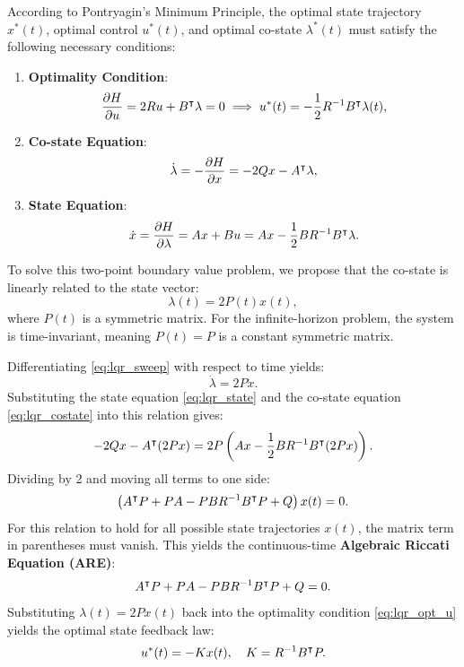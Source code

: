 According to Pontryagin's Minimum Principle, the optimal state trajectory $x^*(t)$, optimal control $u^*(t)$, and optimal co-state $\lambda^*(t)$ must satisfy the following necessary conditions:
\begin{enumerate}
    \item \textbf{Optimality Condition}:
    \begin{equation}
        \frac{\partial H}{\partial u} = 2 R u + B^\intercal \lambda = 0 \implies u^*(t) = -\frac{1}{2} R^{-1} B^\intercal \lambda(t) , \label{eq:lqr_opt_u}
    \end{equation}
    \item \textbf{Co-state Equation}:
    \begin{equation}
        \dot{\lambda} = -\frac{\partial H}{\partial x} = -2 Q x - A^\intercal \lambda , \label{eq:lqr_costate}
    \end{equation}
    \item \textbf{State Equation}:
    \begin{equation}
        \dot{x} = \frac{\partial H}{\partial \lambda} = A x + B u = A x - \frac{1}{2} B R^{-1} B^\intercal \lambda . \label{eq:lqr_state}
    \end{equation}
\end{enumerate}

To solve this two-point boundary value problem, we propose that the co-state is linearly related to the state vector:
\begin{equation}
    \lambda(t) = 2 P(t) x(t) , \label{eq:lqr_sweep}
\end{equation}
where $P(t)$ is a symmetric matrix. For the infinite-horizon problem, the system is time-invariant, meaning $P(t) = P$ is a constant symmetric matrix.

Differentiating \eqref{eq:lqr_sweep} with respect to time yields:
\begin{equation}
\dot{\lambda} = 2 P \dot{x} .
\end{equation}
Substituting the state equation \eqref{eq:lqr_state} and the co-state equation \eqref{eq:lqr_costate} into this relation gives:
\begin{equation}
-2 Q x - A^\intercal (2 P x) = 2 P \left( A x - \frac{1}{2} B R^{-1} B^\intercal (2 P x) \right) .
\end{equation}
Dividing by 2 and moving all terms to one side:
\begin{equation}
\left( A^\intercal P + P A - P B R^{-1} B^\intercal P + Q \right) x(t) = 0 .
\end{equation}
For this relation to hold for all possible state trajectories $x(t)$, the matrix term in parentheses must vanish. This yields the continuous-time \textbf{Algebraic Riccati Equation (ARE)}:
\begin{equation}
    A^\intercal P + P A - P B R^{-1} B^\intercal P + Q = 0 . \label{eq:lqr_are}
\end{equation}
Substituting $\lambda(t) = 2 P x(t)$ back into the optimality condition \eqref{eq:lqr_opt_u} yields the optimal state feedback law:
\begin{equation}
    u^*(t) = -K x(t), \quad K = R^{-1} B^\intercal P . \label{eq:lqr_gain}
\end{equation}

